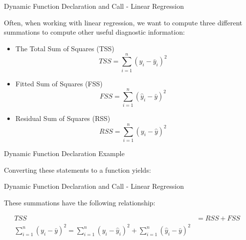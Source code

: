 \begin{frame}{Dynamic Function Declaration and Call - Linear Regression}

Often, when working with linear regression, we want to compute three
different summations to compute other useful diagnostic information:

\begin{itemize}
\tightlist
\item
  The Total Sum of Squares (TSS)
  \[TSS = \sum\limits_{i = 1}^n { { {\left( { {y_i} - { {\bar y}_i} } \right)}^2} }\]
\item
  Fitted Sum of Squares (FSS)
  \[FSS = \sum\limits_{i = 1}^n { { {\left( { { {\hat y}_i} - \bar y} \right)}^2} }\]
\item
  Residual Sum of Squares (RSS)
  \[RSS = \sum\limits_{i = 1}^n { { {\left( { {y_i} - \hat y} \right)}^2} }\]
\end{itemize}

\end{frame}

\begin{frame}[fragile]{Dynamic Function Declaration Example}

Converting these statements to a function yields:

\begin{Shaded}
\begin{Highlighting}[]
\StringTok{ }
  \NormalTok{(}\StringTok{ } \NormalTok{))}
\NormalTok{\}}

\StringTok{ }
  \NormalTok{(}\StringTok{ } \NormalTok{))}
\NormalTok{\}}

\StringTok{ }
  \NormalTok{(}\StringTok{ } \NormalTok{))}
\NormalTok{\}}
\end{Highlighting}
\end{Shaded}

\end{frame}

\begin{frame}{Dynamic Function Declaration and Call - Linear Regression}

These summations have the following relationship:

\[\begin{aligned}
  TSS &= RSS + FSS \\
\sum\limits_{i = 1}^n { { {\left( { {y_i} - \bar y} \right)}^2} }  = \sum\limits_{i = 1}^n { { {\left( { {y_i} - { {\hat y}_i} } \right)}^2} } + \sum\limits_{i = 1}^n { { {\left( { { {\hat y}_i} - \bar y} \right)}^2} } 
\end{aligned}\]

\end{frame}


